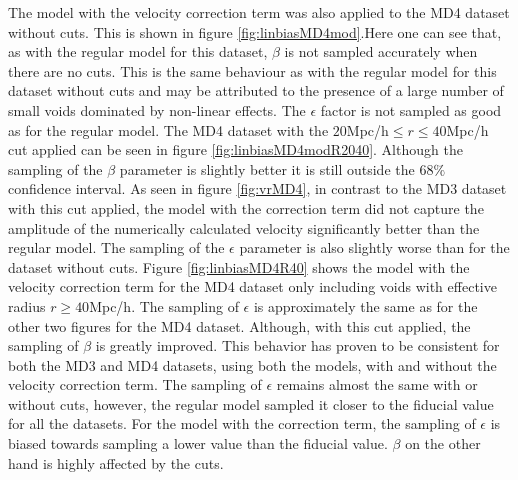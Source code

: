 The model with the velocity correction term was also applied to the MD4 dataset without cuts. This is shown in figure \ref{fig:linbiasMD4mod}.Here one can see that, as with the regular model for this dataset, $\beta$ is not sampled accurately when there are no cuts. 
This is the same behaviour as with the regular model for this dataset without cuts and may be attributed to the presence of a large number of small voids dominated by non-linear effects. The $\epsilon$ factor is not sampled as good as for the regular model. The MD4 dataset with the $20$Mpc/h$\leq r\leq 40$Mpc/h cut applied can be seen in figure \ref{fig:linbiasMD4modR2040}. Although the sampling of the $\beta$ parameter is slightly better it is still outside the $68\%$ confidence interval. As seen in figure \ref{fig:vrMD4}, in contrast to the MD3 dataset with this cut applied, the model with the correction term did not capture the amplitude of the numerically calculated velocity significantly better than the regular model. The sampling of the $\epsilon$ parameter is also slightly worse than for the dataset without cuts. Figure \ref{fig:linbiasMD4R40} shows the model with the velocity correction term for the MD4 dataset only including voids with effective radius $r\geq 40$Mpc/h. The sampling of $\epsilon$ is approximately the same as for the other two figures for the MD4 dataset. Although, with this cut applied, the sampling of $\beta$ is greatly improved. This behavior has proven to be consistent for both the MD3 and MD4 datasets, using both the models, with and without the velocity correction term. The sampling of $\epsilon$ remains almost the same with or without cuts, however, the regular model sampled it closer to the fiducial value for all the datasets. For the model with the correction term, the sampling of $\epsilon$ is biased towards sampling a lower value than the fiducial value. $\beta$ on the other hand is highly affected by the cuts.

